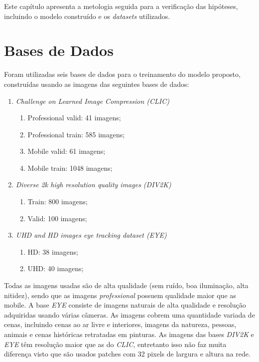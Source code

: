 Este capítulo apresenta a metologia seguida para a verificação das hipóteses, incluindo o modelo construído e os \textit{datasets} utilizados.
\section{Bases de Dados}%
Foram utilizadas seis bases de dados para o treinamento do modelo proposto, construídas usando as imagens das seguintes bases de dados:
\begin{enumerate}
    \item \emph{Challenge on Learned Image Compression (CLIC)}~\cite{clic}
    \begin{enumerate}
        \item Professional valid: 41 imagens;
        \item Professional train: 585 imagens;
        \item Mobile valid: 61 imagens;
        \item Mobile train: 1048 imagens;
    \end{enumerate}
    \item \emph{Diverse 2k high resolution quality images (DIV2K)}~\cite{div2k}
    \begin{enumerate}
        \item Train: 800 imagens;
        \item Valid: 100 imagens;
    \end{enumerate}
    \item \emph{UHD and HD images eye tracking dataset (EYE)}~\cite{ultra_eye}
    \begin{enumerate}
        \item HD: 38 imagens;
        \item UHD: 40 imagens;
    \end{enumerate}
\end{enumerate}
Todas as imagens usadas são de alta qualidade (sem ruído, boa iluminação, alta nitidez), sendo que as imagens \textit{professional} possuem qualidade maior que as {mobile}. A base \textit{EYE} consiste de imagens naturais de alta qualidade e resolução adquiridas usando várias câmeras. As imagens cobrem uma quantidade variada de cenas, incluindo cenas ao ar livre e interiores, imagens da natureza, pessoas, animais e cenas históricas retratadas em pinturas. As imagens das bases \textit{DIV2K} e \textit{EYE} têm resolução maior que as do \textit{CLIC}, entretanto isso não faz muita diferença visto que são usados patches com 32 pixels de largura e altura na rede.

